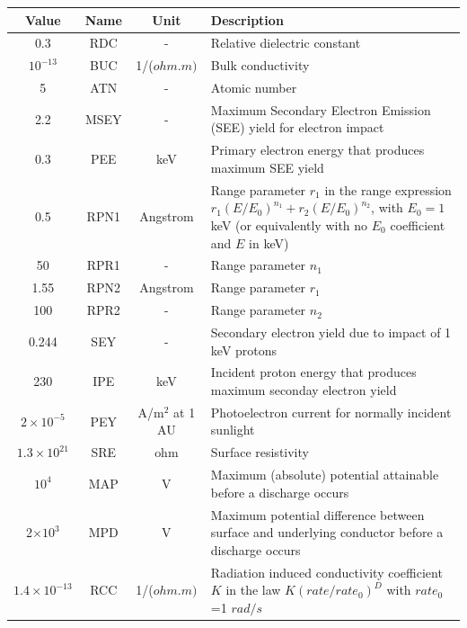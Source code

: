 \documentclass[a4paper, 12pt]{article}
\begin{document}
\begin{center}
\begin{tabular}{|c|c|c|p{9cm}|}
    \hline
    \textbf{Value} & \textbf{Name} & \textbf{Unit} & \textbf{Description} \\
    \hline
    0.3 & RDC & - & Relative dielectric constant \\
    \hline
    $10^{-13}$ & BUC & 1/($\si{ohm.m})$ & Bulk conductivity\\
    \hline
    5 & ATN & - & Atomic number \\ 
    \hline
    2.2 & MSEY & - & Maximum Secondary Electron Emission (SEE) yield for electron impact \\
    \hline
    0.3 & PEE & keV & Primary electron energy that produces maximum SEE yield \\ 
    \hline
    0.5 & RPN1 & Angstrom & Range parameter $r_1$ in the range expression $r_1(E/E_0)^{n_1}+r_2(E/E_0)^{n_2}$, with $E_0=1$ keV (or equivalently with no $E_0$ coefficient and $E$ in keV) \\ 
    \hline
    50 & RPR1 & - & Range parameter $n_1$ \\ 
    \hline
    1.55 & RPN2 & Angstrom & Range parameter $r_1$ \\ 
    \hline
    100 & RPR2 & - & Range parameter $n_2$ \\ 
    \hline
    0.244 & SEY & - & Secondary electron yield due to impact of 1 keV protons \\ 
    \hline
    230 & IPE & keV & Incident proton energy that produces maximum seconday electron yield \\ 
    \hline
    $2 \times 10^{-5}$ & PEY & A/m$^{2}$ at 1 AU & Photoelectron current for normally incident sunlight \\ 
    \hline
    $1.3 \times 10^{21}$ & SRE & ohm & Surface resistivity \\ 
    \hline
    $10^4$ & MAP & V & Maximum (absolute) potential attainable before a discharge occurs \\ 
    \hline
    2$\times 10^{3}$ & MPD & V & Maximum potential difference between surface and underlying conductor before a discharge occurs \\ 
    \hline
    $1.4 \times 10^{-13}$ & RCC & 1/($\si{ohm.m})$ & Radiation induced conductivity coefficient $K$ in the law $K(rate/rate_0)^D$ with $rate_0$=1 $\si{rad/s}$ \\ 
    \hline
\end{tabular}
\end{center}
\egroup
\end{document}

